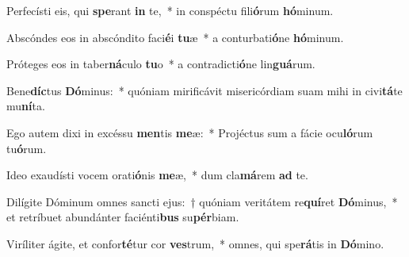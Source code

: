 \item Perfecísti eis, qui \textbf{spe}rant \textbf{in} te,~* in conspéctu fili\textbf{ó}rum \textbf{hó}minum.
\item Abscóndes eos in abscóndito faci\textbf{é}i \textbf{tu}æ~* a conturbati\textbf{ó}ne \textbf{hó}minum.
\item Próteges eos in taber\textbf{ná}culo \textbf{tu}o~* a contradicti\textbf{ó}ne lin\textbf{guá}rum.
\item Bene\textbf{díc}tus \textbf{Dó}minus:~* quóniam mirificávit misericórdiam suam mihi in civi\textbf{tá}te mu\textbf{ní}ta.
\item Ego autem dixi in excéssu \textbf{men}tis \textbf{me}æ:~* Projéctus sum a fácie ocu\textbf{ló}rum tu\textbf{ó}rum.
\item Ideo exaudísti vocem orati\textbf{ó}nis \textbf{me}æ,~* dum cla\textbf{má}rem \textbf{ad} te.
\item Dilígite Dóminum omnes sancti ejus:~† quóniam veritátem re\textbf{quí}ret \textbf{Dó}minus,~* et retríbuet abundánter faciénti\textbf{bus} su\textbf{pér}biam.
\item Viríliter ágite, et confor\textbf{té}tur cor \textbf{ves}trum,~* omnes, qui spe\textbf{rá}tis in \textbf{Dó}mino.

